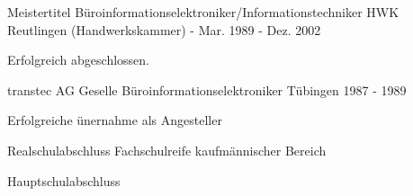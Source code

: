 

\begin{cventries}

  \cventry
    {Meistertitel Büroinformationselektroniker/Informationstechniker} %
    {HWK Reutlingen (Handwerkskammer)} %
    {-} %
    {Mar. 1989 - Dez. 2002} %
    {
      \begin{cvitems} %
        \item {Erfolgreich abgeschlossen.}
      \end{cvitems}
    }
	
	
  \cventry
    {transtec AG} %
	{Geselle Büroinformationselektroniker} %
    {Tübingen} %
    {1987 - 1989} %
    {
      \begin{cvitems} %
		\item {Erfolgreiche ünernahme als Angesteller}
	  \end{cvitems}
    }

  \cventry
    {Realschulabschluss} %
    {Fachschulreife kaufmännischer Bereich} %
    {} %
    {} %
    {
      \begin{cvitems} %
      \end{cvitems}
    }

  \cventry
    {} %
    {Hauptschulabschluss} %
    {} %
    {} %
    {
      \begin{cvitems} %
      \end{cvitems}
    }
	
\end{cventries}